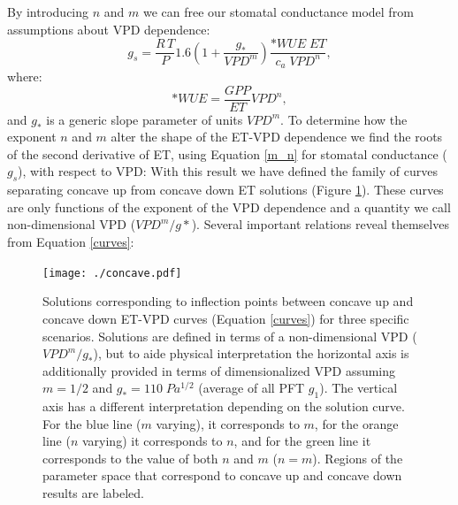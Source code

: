 By introducing $n$ and $m$ we can free our stomatal
conductance model from assumptions about VPD dependence:
  \begin{equation}
    g_s = \frac{R \, T}{P} 1.6 \left(1 + \frac{g_*}{VPD^m}\right) \frac{*WUE \; ET}{c_a \; VPD^n},
    \label{m_n}
  \end{equation}
where:
\[*WUE = \frac{GPP}{ET}VPD^n,\] and $g_*$ is a generic slope parameter
of units $VPD^m$. To determine how the exponent $n$ and $m$ alter the
shape of the ET-VPD dependence we find the roots of the second
derivative of ET, using Equation \ref{m_n} for stomatal conductance
($g_s$), with respect to VPD:  With this
result we have defined the family of curves separating concave up from
concave down ET solutions (Figure \ref{concave}). These curves are
only functions of the exponent of the VPD dependence and a quantity we
call non-dimensional VPD ($VPD^m/g*$). Several important
relations reveal themselves from Equation \ref{curves}:

\begin{figure}
  \centering
  \centerline{\texttt{[image: ./concave.pdf]}}
  \caption{ Solutions corresponding to inflection points between
    concave up and concave down ET-VPD curves (Equation \ref{curves})
    for three specific scenarios. Solutions are defined in terms of a
    non-dimensional VPD ($VPD^m/g_*$), but to aide physical
    interpretation the horizontal axis is additionally provided in terms of dimensionalized VPD assuming $m=1/2$ and
    $g_*=110\; Pa^{1/2}$ (average of all PFT $g_1$). The vertical axis
    has a different interpretation depending on the solution
    curve. For the blue line ($m$ varying), it corresponds to $m$,
    for the orange line ($n$ varying) it corresponds to $n$, and for
    the green line it corresponds to the value of both $n$ and $m$
    ($n=m$). Regions of the parameter space that correspond to
    concave up and concave down results are labeled.}
  \label{concave}
\end{figure}

